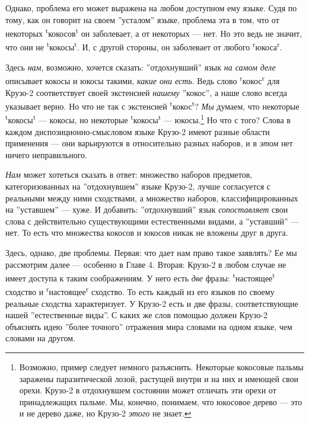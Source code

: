 \documentclass[11pt]{book}
\begin{document}
Однако, проблема его может выражена на любом доступном ему языке. Судя по тому, как он говорит на своем ''усталом'' языке, проблема эта в том, что от некоторых \textsuperscript{t}кокосов\textsuperscript{t} он заболевает, а от некоторых --- нет. Но это ведь не значит, что они не \textsuperscript{t}кокосы\textsuperscript{t}. И, с другой стороны, он заболевает от любого \textsuperscript{r}юкоса\textsuperscript{r}.

Здесь \textit{нам}, возможно, хочется сказать: ''отдохнувший'' язык \textit{на самом деле} описывает кокосы и юкосы такими, \textit{какие они есть}. Ведь слово \textsuperscript{r}кокос\textsuperscript{r} для Крузо-2 соответствует своей экстенсией \textit{нашему} ''кокос'', а наше слово всегда указывает верно. Но что не так с экстенсией \textsuperscript{t}кокос\textsuperscript{t}? \textit{Мы} думаем, что некоторые \textsuperscript{t}кокосы\textsuperscript{t} --- кокосы, но некоторые \textsuperscript{t}кокосы\textsuperscript{t} --- юкосы.\footnote{Возможно, пример следует немного разъяснить. Некоторые кокосовые пальмы заражены паразитической лозой, растущей внутри и на них и имеющей свои орехи. Крузо-2 в отдохнувшем состоянии может отличать эти орехи от принадлежащих пальме. Мы, конечно, понимаем, что юкосовое дерево --- это и не дерево даже, но Крузо-2 \textit{этого} не знает.} Но что с того? Слова в каждом диспозиционно-смысловом языке Крузо-2 имеют разные области применения --- они варьируются в относительно разных наборов, и в \textit{этом} нет ничего неправильного.

\textit{Нам} может хотеться сказать в ответ: множество наборов предметов, категоризованных на ''отдохнувшем'' языке Крузо-2, лучше согласуется с реальными между ними сходствами, а множество наборов, классифицированных на ''уставшем'' --- хуже. И добавить: ''отдохнувший'' язык \textit{сопоставляет} свои слова с действительно существующими естественными видами, а ''уставший'' --- нет. То есть что множества кокосов и юкосов никак не вложены друг в друга.

Здесь, однако, две проблемы. Первая: что дает нам право такое заявлять? Ее мы рассмотрим далее --- особенно в Главе 4. Вторая: Крузо-2 в любом случае не имеет доступа к таким соображениям. У него есть \textit{две} фразы: \textsuperscript{t}настоящее\textsuperscript{t} сходство и \textsuperscript{r}настоящее\textsuperscript{r} сходство. То есть каждый из его языков по своему реальные сходства характеризует. У Крузо-2 есть и две фразы, соответствующие нашей ''естественные виды''. С каких же слов помощью должен Крузо-2 объяснять идею ''более точного'' отражения мира словами на одном языке, чем словами на другом.
\end{document}

